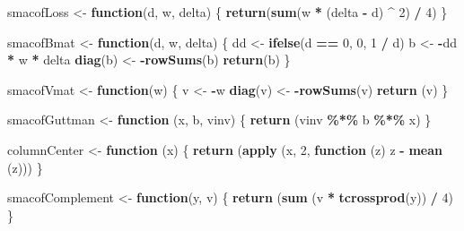 \documentclass[
  12pt,
]{article}
\newenvironment{Shaded}{\begin{snugshade}}{\end{snugshade}}
\newcommand{\ControlFlowTok}[1]{\textcolor[rgb]{0.13,0.29,0.53}{\textbf{#1}}}
\newcommand{\DecValTok}[1]{\textcolor[rgb]{0.00,0.00,0.81}{#1}}
\newcommand{\FunctionTok}[1]{\textcolor[rgb]{0.13,0.29,0.53}{\textbf{#1}}}
\newcommand{\NormalTok}[1]{#1}
\newcommand{\OtherTok}[1]{\textcolor[rgb]{0.56,0.35,0.01}{#1}}
\newcommand{\SpecialCharTok}[1]{\textcolor[rgb]{0.81,0.36,0.00}{\textbf{#1}}}
\begin{document}
\begin{Shaded}
\begin{Highlighting}[]
\NormalTok{smacofLoss }\OtherTok{\textless{}{-}} \ControlFlowTok{function}\NormalTok{(d, w, delta) \{}
  \FunctionTok{return}\NormalTok{(}\FunctionTok{sum}\NormalTok{(w }\SpecialCharTok{*}\NormalTok{ (delta }\SpecialCharTok{{-}}\NormalTok{ d) }\SpecialCharTok{\^{}} \DecValTok{2}\NormalTok{) }\SpecialCharTok{/} \DecValTok{4}\NormalTok{)}
\NormalTok{\}}

\NormalTok{smacofBmat }\OtherTok{\textless{}{-}} \ControlFlowTok{function}\NormalTok{(d, w, delta) \{}
\NormalTok{  dd }\OtherTok{\textless{}{-}} \FunctionTok{ifelse}\NormalTok{(d }\SpecialCharTok{==} \DecValTok{0}\NormalTok{, }\DecValTok{0}\NormalTok{, }\DecValTok{1} \SpecialCharTok{/}\NormalTok{ d)}
\NormalTok{  b }\OtherTok{\textless{}{-}} \SpecialCharTok{{-}}\NormalTok{dd }\SpecialCharTok{*}\NormalTok{ w }\SpecialCharTok{*}\NormalTok{ delta}
  \FunctionTok{diag}\NormalTok{(b) }\OtherTok{\textless{}{-}} \SpecialCharTok{{-}}\FunctionTok{rowSums}\NormalTok{(b)}
  \FunctionTok{return}\NormalTok{(b)}
\NormalTok{\}}

\NormalTok{smacofVmat }\OtherTok{\textless{}{-}} \ControlFlowTok{function}\NormalTok{(w) \{}
\NormalTok{  v }\OtherTok{\textless{}{-}} \SpecialCharTok{{-}}\NormalTok{w}
  \FunctionTok{diag}\NormalTok{(v) }\OtherTok{\textless{}{-}} \SpecialCharTok{{-}}\FunctionTok{rowSums}\NormalTok{(v)}
  \FunctionTok{return}\NormalTok{ (v)}
\NormalTok{\}}

\NormalTok{smacofGuttman }\OtherTok{\textless{}{-}} \ControlFlowTok{function}\NormalTok{ (x, b, vinv) \{}
  \FunctionTok{return}\NormalTok{ (vinv }\SpecialCharTok{\%*\%}\NormalTok{ b }\SpecialCharTok{\%*\%}\NormalTok{ x)}
\NormalTok{\}}

\NormalTok{columnCenter }\OtherTok{\textless{}{-}} \ControlFlowTok{function}\NormalTok{ (x) \{}
  \FunctionTok{return}\NormalTok{ (}\FunctionTok{apply}\NormalTok{ (x, }\DecValTok{2}\NormalTok{, }\ControlFlowTok{function}\NormalTok{ (z)}
\NormalTok{    z }\SpecialCharTok{{-}} \FunctionTok{mean}\NormalTok{ (z)))}
\NormalTok{\}}

\NormalTok{smacofComplement }\OtherTok{\textless{}{-}} \ControlFlowTok{function}\NormalTok{(y, v) \{}
  \FunctionTok{return}\NormalTok{ (}\FunctionTok{sum}\NormalTok{ (v }\SpecialCharTok{*} \FunctionTok{tcrossprod}\NormalTok{(y)) }\SpecialCharTok{/} \DecValTok{4}\NormalTok{)}
\NormalTok{\}}


\end{Highlighting}
\end{Shaded}
\end{document}
